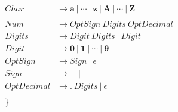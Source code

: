 \documentclass{article}
\begin{document}
\begin{align*}
	\mathit{Char}       & \rightarrow \mathbf{a} ~|~ \cdots ~|~ \mathbf{z} ~|~
	\mathbf{A} ~|~ \cdots ~|~ \mathbf{Z}                                                       \\
	\\
	\mathit{Num}        & \rightarrow \mathit{OptSign} ~ \mathit{Digits} ~ \mathit{OptDecimal} \\
	\mathit{Digits}     & \rightarrow \mathit{Digit} ~ \mathit{Digits} ~|~ \mathit{Digit}      \\
	\mathit{Digit}      & \rightarrow \mathbf{0} ~|~ \mathbf{1} ~|~ \cdots ~|~ \mathbf{9}      \\
	\mathit{OptSign}    & \rightarrow \mathit{Sign} ~|~ \epsilon                               \\
	\mathit{Sign}       & \rightarrow \boldsymbol{+} ~|~ \boldsymbol{-}                        \\
	\mathit{OptDecimal} & \rightarrow \boldsymbol{.} ~ \mathit{Digits} ~|~ \epsilon            \\
	\\
	\}
\end{align*}
\end{document}
